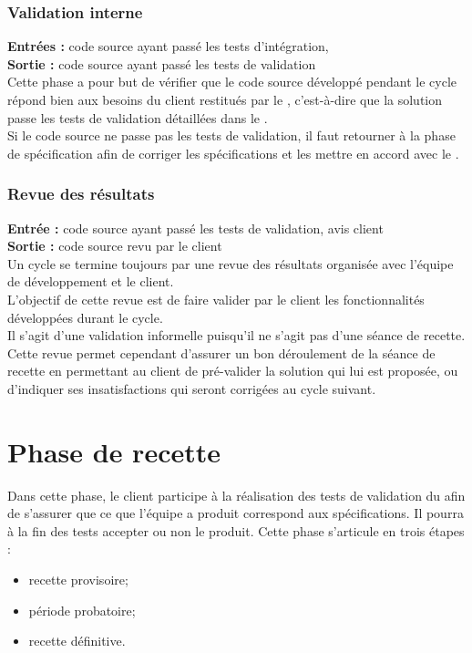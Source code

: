 \subsubsection{Validation interne}

\textbf{Entrées :} code source ayant passé les tests d’intégration, \PTVCourt \\
\textbf{Sortie : } code source ayant passé les tests de validation \\
Cette phase a pour but de vérifier que le code source développé pendant le cycle répond bien aux besoins du client restitués par le \DSECourt, c’est-à-dire que la solution passe les tests de validation détaillées dans le \PTVCourt .\\
Si le code source ne passe pas les tests de validation, il faut retourner à la phase de spécification afin de corriger les spécifications et les mettre en accord avec le \DSECourt.

\subsubsection{Revue des résultats}
\textbf{Entrée :} code source ayant passé les tests de validation, avis client \\
\textbf{Sortie :} code source revu par le client \\

Un cycle se termine toujours par une revue des résultats organisée avec l’équipe de développement et le client. \\
L’objectif de cette revue est de faire valider par le client les fonctionnalités développées durant le cycle.\\ 
Il s’agit d’une validation informelle puisqu’il ne s’agit pas d’une séance de
recette. Cette revue permet cependant d’assurer un bon déroulement de la séance de recette en permettant au client de pré-valider la solution qui lui est proposée, ou d’indiquer ses insatisfactions qui seront corrigées au cycle suivant. \\


\section{Phase de recette}
\label{recette}

Dans cette phase, le client participe à la réalisation des tests de validation du \PTV{} afin de s’assurer que ce que l’équipe a produit correspond aux spécifications. Il pourra à la fin des tests accepter ou non le produit.
Cette phase s’articule en trois étapes : 
\begin{itemize}
\item recette provisoire;
\item période probatoire; 
\item recette définitive.
\end{itemize}

